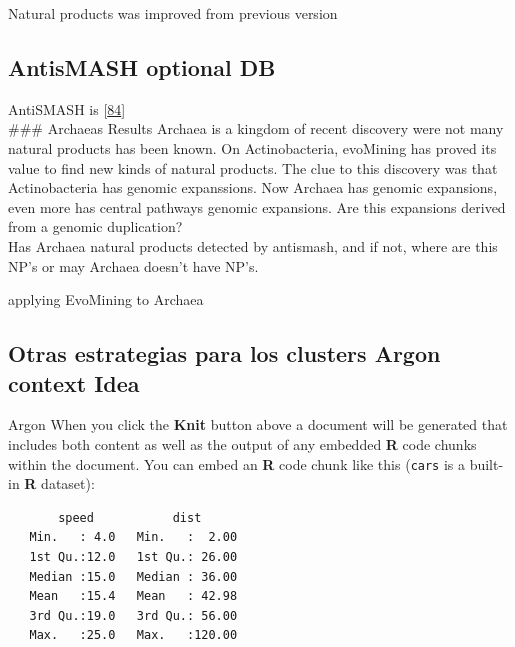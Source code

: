 \documentclass[12pt,twoside]{reedthesis}
\begin{document}
  Natural products was improved from previous version
  
  \subsection{AntisMASH optional DB}\label{antismash-optional-db}
  
  AntiSMASH is
  {[}\protect\hyperlink{ref-weberux5fantismashux5f2015}{84}{]}\\
  \#\#\# Archaeas Results Archaea is a kingdom of recent discovery were
  not many natural products has been known. On Actinobacteria, evoMining
  has proved its value to find new kinds of natural products. The clue to
  this discovery was that Actinobacteria has genomic expanssions. Now
  Archaea has genomic expansions, even more has central pathways genomic
  expansions. Are this expansions derived from a genomic duplication?\\
  Has Archaea natural products detected by antismash, and if not, where
  are this NP's or may Archaea doesn't have NP's.
  
  applying EvoMining to Archaea
  
  \subsection{Otras estrategias para los clusters Argon context
  Idea}\label{otras-estrategias-para-los-clusters-argon-context-idea}
  
  Argon When you click the \textbf{Knit} button above a document will be
  generated that includes both content as well as the output of any
  embedded \textbf{R} code chunks within the document. You can embed an
  \textbf{R} code chunk like this (\texttt{cars} is a built-in \textbf{R}
  dataset):
  
  \begin{Shaded}
  \begin{Highlighting}[]
  \end{Highlighting}
  \end{Shaded}
  
  \begin{verbatim}
       speed           dist       
   Min.   : 4.0   Min.   :  2.00  
   1st Qu.:12.0   1st Qu.: 26.00  
   Median :15.0   Median : 36.00  
   Mean   :15.4   Mean   : 42.98  
   3rd Qu.:19.0   3rd Qu.: 56.00  
   Max.   :25.0   Max.   :120.00  
  \end{verbatim}
  
\end{document}
